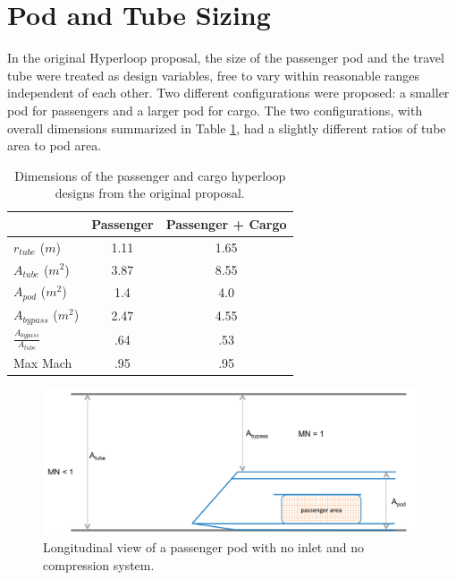 \documentclass[heading.tex]{subfiles}
\begin{document}
\section{Pod and Tube Sizing}
\label{s:sizing}

In the original Hyperloop proposal, the size of the passenger pod and the travel tube were treated as design variables, 
free to vary within reasonable ranges independent of each other. Two different configurations were proposed: a smaller 
pod for passengers and a larger pod for cargo. The two configurations, with overall dimensions summarized 
in Table \ref{t:hyperbase}, had a slightly different ratios of tube area to pod area. 

\begin{table}
  \centering
  \caption{Dimensions of the passenger and cargo hyperloop designs from the original proposal. }
  \label{t:hyperbase}
  \begin{tabular}{l c c}
    \hline
                                  &  Passenger       & Passenger + Cargo \\ \hline
    $r_{tube}$ ($m$)              &        1.11      &     1.65  \\
    $A_{tube}$  ($m^2$)           &        3.87      &     8.55  \\
    $A_{pod}$ ($m^2$)             &        1.4       &     4.0   \\ 
    $A_{bypass}$ ($m^2$)          &        2.47      &     4.55  \\ 
    $\frac{A_{bypass}}{A_{tube}}$ &        .64       &     .53   \\
    Max Mach                      &        .95       &     .95   \\
    \hline
  \end{tabular}
\end{table}

\begin{figure}[hbtp]
\centering
\includegraphics[width=.85\textwidth]{images/podA}
\caption{Longitudinal view of a passenger pod with no inlet and no compression system.}
\label{f:ClosedPod}
\end{figure}
\end{document}

